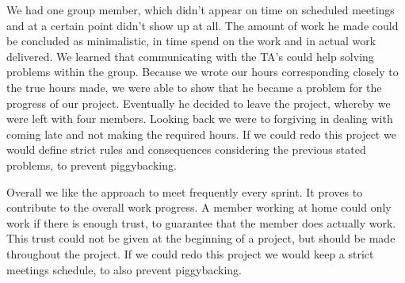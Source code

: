 We had one group member, which didn't appear on time on scheduled meetings and at a certain point didn't show up at all. The amount of work he made could be concluded as minimalistic, in time spend on the work and in actual work delivered. We learned that communicating with the TA's could help solving problems within the group. Because we wrote our hours corresponding closely to the true hours made, we were able to show that he became a problem for the progress of our project. Eventually he decided to leave the project, whereby we were left with four members. Looking back we were to forgiving in dealing with coming late and not making the required hours. If we could redo this project we would define strict rules and consequences considering the previous stated problems, to prevent piggybacking.

Overall we like the approach to meet frequently every sprint. It proves to contribute to the overall work progress. A member working at home could only work if there is enough trust, to guarantee that the member does actually work. This trust could not be given at the beginning of a project, but should be made throughout the project. If we could redo this project we would keep a strict meetings schedule, to also prevent piggybacking.